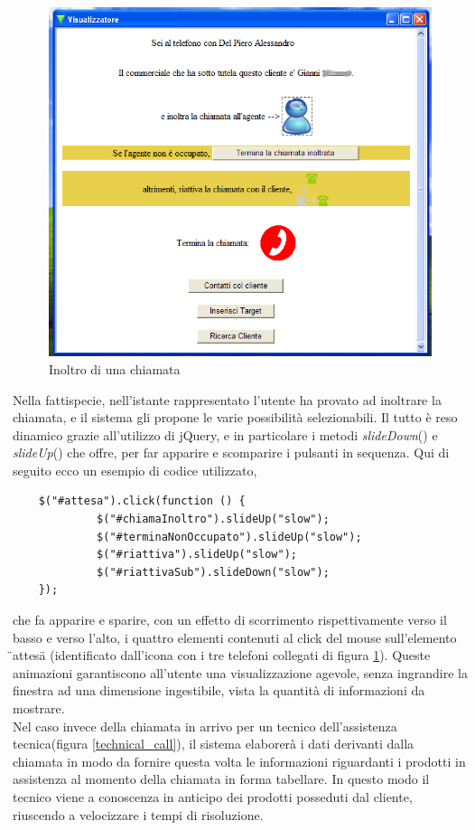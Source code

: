 \begin{figure}[!ht]
\centering
  \includegraphics[scale=0.75]{./images/inoltroScreen.png}
\caption{Inoltro di una chiamata}
\label{forward_call}
\end{figure}

\noindent
Nella fattispecie, nell'istante rappresentato l'utente ha provato ad inoltrare la chiamata, e il sistema gli propone le varie possibilit\`a selezionabili. Il tutto \`e reso dinamico grazie all'utilizzo di jQuery, e in particolare i metodi \textit{slideDown}() e \textit{slideUp}() che offre, per far apparire e scomparire i pulsanti in sequenza. Qui di seguito ecco un esempio di codice utilizzato,


\begin{verbatim}
    $("#attesa").click(function () {
             $("#chiamaInoltro").slideUp("slow");
             $("#terminaNonOccupato").slideUp("slow");
             $("#riattiva").slideUp("slow");
             $("#riattivaSub").slideDown("slow");
    });
\end{verbatim}               

\noindent
che fa apparire e sparire, con un effetto di scorrimento rispettivamente verso il basso e verso l'alto, i quattro elementi contenuti al click del mouse sull'elemento \"{}attesa\"{} (identificato dall'icona con i tre telefoni collegati di figura \ref{forward_call}). Queste animazioni garantiscono all'utente una visualizzazione agevole, senza ingrandire la finestra ad una dimensione ingestibile, vista la quantit\`a di informazioni da mostrare. \\
\noindent
Nel caso invece della chiamata in arrivo per un tecnico dell'assistenza tecnica(figura \ref{technical_call}), il sistema elaborer\`a i dati derivanti dalla chiamata in modo da fornire questa volta le informazioni riguardanti i prodotti in assistenza al momento della chiamata in forma tabellare. In questo modo il tecnico viene a conoscenza in anticipo dei prodotti posseduti dal cliente, riuscendo a velocizzare i tempi di risoluzione.

